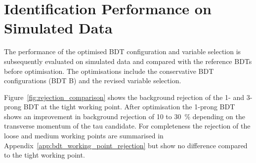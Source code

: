 

\section{Identification Performance on Simulated Data}
\label{sec:bdt_perf}

The performance of the optimised BDT configuration and variable selection is
subsequently evaluated on simulated data and compared with the reference BDTs
before optimisation. The optimisations include the conservative BDT
configurations (BDT B) and the revised variable selection.

Figure~\ref{fig:rejection_comparison} shows the background rejection of the 1-
and 3-prong BDT at the tight working point. After optimisation the 1-prong BDT
shows an improvement in background rejection of \num{10} to \SI{30}{\percent}
depending on the transverse momentum of the tau candidate. For completeness the
rejection of the loose and medium working points are summarised in
Appendix~\ref{app:bdt_working_point_rejection} but show no difference compared
to the tight working point.

